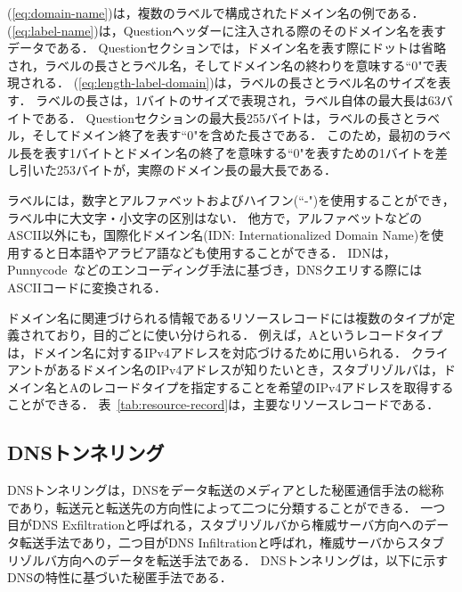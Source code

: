 (\ref{eq:domain-name})は，複数のラベルで構成されたドメイン名の例である．
(\ref{eq:label-name})は，Questionヘッダーに注入される際のそのドメイン名を表すデータである．
Questionセクションでは，ドメイン名を表す際にドットは省略され，ラベルの長さとラベル名，そしてドメイン名の終わりを意味する``0"で表現される．
(\ref{eq:length-label-domain})は，ラベルの長さとラベル名のサイズを表す．
ラベルの長さは，1バイトのサイズで表現され，ラベル自体の最大長は63バイトである．
Questionセクションの最大長255バイトは，ラベルの長さとラベル，そしてドメイン終了を表す``0"を含めた長さである．
このため，最初のラベル長を表す1バイトとドメイン名の終了を意味する``0"を表すための1バイトを差し引いた253バイトが，実際のドメイン長の最大長である．


ラベルには，数字とアルファベットおよびハイフン(``-")を使用することができ，ラベル中に大文字・小文字の区別はない．
他方で，アルファベットなどのASCII以外にも，国際化ドメイン名(IDN: Internationalized Domain Name)を使用すると日本語やアラビア語なども使用することができる．
IDNは，Punnycode~\cite{punnycode}などのエンコーディング手法に基づき，DNSクエリする際にはASCIIコードに変換される．

ドメイン名に関連づけられる情報であるリソースレコードには複数のタイプが定義されており，目的ごとに使い分けられる．
例えば，Aというレコードタイプは，ドメイン名に対するIPv4アドレスを対応づけるために用いられる．
クライアントがあるドメイン名のIPv4アドレスが知りたいとき，スタブリゾルバは，ドメイン名とAのレコードタイプを指定することを希望のIPv4アドレスを取得することができる．
表~\ref{tab:resource-record}は，主要なリソースレコードである．




\subsection{DNSトンネリング}
\label{sec:dns-tunneling}
DNSトンネリングは，DNSをデータ転送のメディアとした秘匿通信手法の総称であり，転送元と転送先の方向性によって二つに分類することができる．
一つ目がDNS Exfiltrationと呼ばれる，スタブリゾルバから権威サーバ方向へのデータ転送手法であり，二つ目がDNS Infiltrationと呼ばれ，権威サーバからスタブリゾルバ方向へのデータを転送手法である．
DNSトンネリングは，以下に示すDNSの特性に基づいた秘匿手法である．

